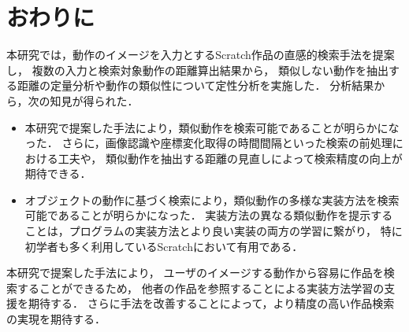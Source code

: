 \documentclass[11pt]{jreport}
\begin{document}
\chapter{おわりに}
本研究では，動作のイメージを入力とするScratch作品の直感的検索手法を提案し，
複数の入力と検索対象動作の距離算出結果から，
類似しない動作を抽出する距離の定量分析や動作の類似性について定性分析を実施した．
分析結果から，次の知見が得られた．

\begin{itemize}
    \item 本研究で提案した手法により，類似動作を検索可能であることが明らかになった．
    さらに，画像認識や座標変化取得の時間間隔といった検索の前処理における工夫や，
    類似動作を抽出する距離の見直しによって検索精度の向上が期待できる．
    \item オブジェクトの動作に基づく検索により，類似動作の多様な実装方法を検索可能であることが明らかになった．
    実装方法の異なる類似動作を提示することは，プログラムの実装方法とより良い実装の両方の学習に繋がり，
    特に初学者も多く利用しているScratchにおいて有用である．
\end{itemize}

本研究で提案した手法により，
ユーザのイメージする動作から容易に作品を検索することができるため，
他者の作品を参照することによる実装方法学習の支援を期待する．
さらに手法を改善することによって，より精度の高い作品検索の実現を期待する．



 \begin{acknowledgements}
 \end{acknowledgements}

\end{document}
